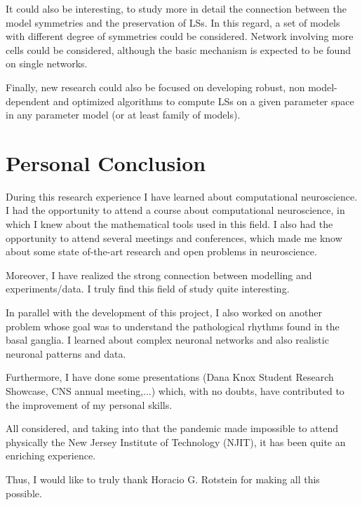 It could also be interesting, to study more in detail the connection between the model symmetries and the preservation of LSs. In this regard, a set of models with different degree of symmetries could be considered. Network involving more cells could be considered, although the basic mechanism is expected to be found on single networks.

Finally, new research could also be focused on developing robust, non model-dependent and optimized algorithms to compute LSs on a given parameter space in any parameter model (or at least family of models).  

\section{Personal Conclusion}
During this research experience I have learned about computational neuroscience. I had the opportunity to attend a course about computational neuroscience, in which I knew about the mathematical tools used in this field. I also had the opportunity to attend several meetings and conferences, which made me know about some state of-the-art research and open problems in neuroscience.

Moreover, I have realized the strong connection between modelling and experiments/data. I truly find this field of study quite interesting.

In parallel with the development of this project, I also worked on another problem whose goal was to understand the pathological rhythms found in the basal ganglia. I learned about complex neuronal networks and also realistic neuronal patterns and data.

Furthermore, I have done some presentations (Dana Knox Student Research Showcase, CNS annual meeting,...) which, with no doubts, have contributed to the improvement of my personal skills.

All considered, and taking into that the pandemic made impossible to attend physically the New Jersey Institute of Technology (NJIT), it has been quite an enriching experience. 

Thus, I would like to truly thank Horacio G. Rotstein for making all this possible.